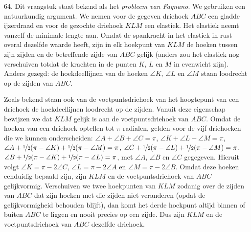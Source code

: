 \begin{problem}{64.}
	Dit vraagstuk staat bekend als het \textit{probleem van Fagnano}. We gebruiken een natuurkundig argument. We nemen voor de gegeven driehoek $ABC$ een gladde ijzerdraad en voor de gezochte driehoek $KLM$ een elastiek. Het elastiek neemt vanzelf de minimale lengte aan. Omdat de spankracht in het elastiek in rust overal dezelfde waarde heeft, zijn in elk hoekpunt van $KLM$ de hoeken tussen zijn zijden en de betreffende zijde van $ABC$ gelijk (anders zou het elastiek nog verschuiven totdat de krachten in de punten $K$, $L$ en $M$ in evenwicht zijn). Anders gezegd: de hoekdeellijnen van de hoeken $\angle K$, $\angle L$ en $\angle M$ staan loodrecht op de zijden van $ABC$.

    Zoals bekend staan ook van de voetpuntsdriehoek van het hoogte\-punt van een driehoek de hoekdeellijnen loodrecht op de zijden. Vanuit deze eigenschap bewijzen we dat $KLM$ gelijk is aan de voetpunts\-driehoek van $ABC$. Omdat de hoeken van een driehoek optellen tot $\pi$ radialen, gelden voor de vijf driehoeken die we kunnen onderscheiden: $\angle A + \angle B + \angle C = \pi$, $\angle K + \angle L + \angle M = \pi$, $\angle A + \nicefrac{1}{2} (\pi - \angle K) + \nicefrac{1}{2} (\pi - \angle M) = \pi$, $\angle C + \nicefrac{1}{2} (\pi - \angle L) + \nicefrac{1}{2} (\pi - \angle M) = \pi$, $\angle B + \nicefrac{1}{2} (\pi - \angle K) + \nicefrac{1}{2} (\pi - \angle L) = \pi$, met $\angle A$, $\angle B$ en $\angle C$ gegegeven. Hieruit volgt $\angle K = \pi - 2 \angle C$, $\angle L = \pi - 2 \angle A$ en $\angle M = \pi - 2 \angle B$. Omdat deze hoeken eenduidig bepaald zijn, zijn $KLM$ en de voetpuntsdriehoek van $ABC$ gelijkvormig. Verschuiven we twee hoekpunten van $KLM$ zodanig over de zijden van $ABC$ dat zijn hoeken met die zijden niet veranderen (opdat de gelijkvormigheid behouden blijft), dan komt het derde hoekpunt altijd binnen of buiten $ABC$ te liggen en nooit precies op een zijde. Dus zijn $KLM$ en de voetpuntsdriehoek van $ABC$ dezelfde driehoek.
\end{problem}

\clearpage

